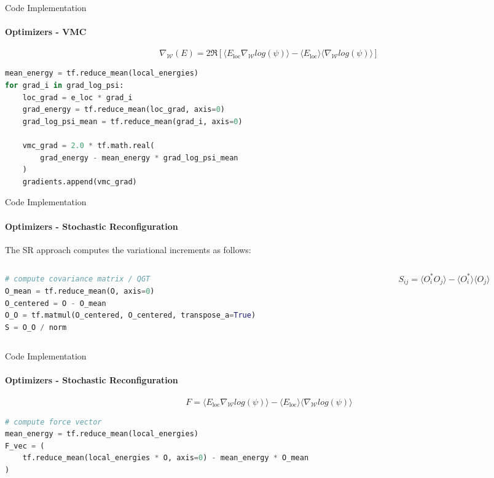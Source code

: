 \documentclass{beamer}
\begin{document}
\begin{frame}[fragile]{Code Implementation}
\framesubtitle{Optimizers - VMC}
$$
\nabla_{\mathcal{W}} \left(E\right)
    = 2 \mathfrak{R} \left[ \langle E_{\text{loc}} \nabla_{\mathcal{W}} log(\psi) \rangle - \langle E_{\text{loc}} \rangle \langle \nabla_{\mathcal{W}} log(\psi) \rangle \right]
$$

\begin{lstlisting}[language=Python, style=kaolstplain]
mean_energy = tf.reduce_mean(local_energies)
for grad_i in grad_log_psi:
	loc_grad = e_loc * grad_i
	grad_energy = tf.reduce_mean(loc_grad, axis=0)
	grad_log_psi_mean = tf.reduce_mean(grad_i, axis=0)

	vmc_grad = 2.0 * tf.math.real(
		grad_energy - mean_energy * grad_log_psi_mean
	)
	gradients.append(vmc_grad)
\end{lstlisting}

\end{frame}


\begin{frame}[fragile]{Code Implementation}
\framesubtitle{Optimizers - Stochastic Reconfiguration}
The SR approach computes the variational increments as follows:
\begin{columns}
\begin{column}{0.6\textwidth}
\begin{lstlisting}[language=Python, style=kaolstplain]
# compute covariance matrix / QGT
O_mean = tf.reduce_mean(O, axis=0)
O_centered = O - O_mean
O_O = tf.matmul(O_centered, O_centered, transpose_a=True)
S = O_O / norm
\end{lstlisting}
\end{column}
\begin{column}{0.38\textwidth}
$$S_{ij} = \langle O_i^{*} O_j \rangle - \langle O_i^{*} \rangle \langle O_j \rangle$$
\end{column}
\end{columns}
\end{frame}

\begin{frame}[fragile]{Code Implementation}
\framesubtitle{Optimizers - Stochastic Reconfiguration}
$$F = \langle E_{\text{loc}} \nabla_{\mathcal{W}} log(\psi) \rangle - \langle E_{\text{loc}} \rangle \langle \nabla_{\mathcal{W}} log(\psi) \rangle$$

\begin{lstlisting}[language=Python, style=kaolstplain]
# compute force vector
mean_energy = tf.reduce_mean(local_energies)
F_vec = (
	tf.reduce_mean(local_energies * O, axis=0) - mean_energy * O_mean
)
\end{lstlisting}
\end{frame}
\end{document}
